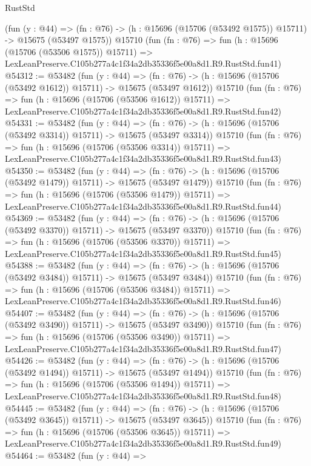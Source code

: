 \begin{lexlean}{RustStd}
\begin{coremodule}
    (fun (y : @44) =>
    (fn : @76) -> (h : @15696 (@15706 (@53492 @1575)) @15711) -> @15675 (@53497 @1575))
    @15710
    (fun (fn : @76) =>
    fun (h : @15696 (@15706 (@53506 @1575)) @15711) =>
    LexLeanPreserve.C105b277a4c1f34a2db35336f5e00a8d1.R9.RustStd.fun41)
@54312 := @53482
    (fun (y : @44) =>
    (fn : @76) -> (h : @15696 (@15706 (@53492 @1612)) @15711) -> @15675 (@53497 @1612))
    @15710
    (fun (fn : @76) =>
    fun (h : @15696 (@15706 (@53506 @1612)) @15711) =>
    LexLeanPreserve.C105b277a4c1f34a2db35336f5e00a8d1.R9.RustStd.fun42)
@54331 := @53482
    (fun (y : @44) =>
    (fn : @76) -> (h : @15696 (@15706 (@53492 @3314)) @15711) -> @15675 (@53497 @3314))
    @15710
    (fun (fn : @76) =>
    fun (h : @15696 (@15706 (@53506 @3314)) @15711) =>
    LexLeanPreserve.C105b277a4c1f34a2db35336f5e00a8d1.R9.RustStd.fun43)
@54350 := @53482
    (fun (y : @44) =>
    (fn : @76) -> (h : @15696 (@15706 (@53492 @1479)) @15711) -> @15675 (@53497 @1479))
    @15710
    (fun (fn : @76) =>
    fun (h : @15696 (@15706 (@53506 @1479)) @15711) =>
    LexLeanPreserve.C105b277a4c1f34a2db35336f5e00a8d1.R9.RustStd.fun44)
@54369 := @53482
    (fun (y : @44) =>
    (fn : @76) -> (h : @15696 (@15706 (@53492 @3370)) @15711) -> @15675 (@53497 @3370))
    @15710
    (fun (fn : @76) =>
    fun (h : @15696 (@15706 (@53506 @3370)) @15711) =>
    LexLeanPreserve.C105b277a4c1f34a2db35336f5e00a8d1.R9.RustStd.fun45)
@54388 := @53482
    (fun (y : @44) =>
    (fn : @76) -> (h : @15696 (@15706 (@53492 @3484)) @15711) -> @15675 (@53497 @3484))
    @15710
    (fun (fn : @76) =>
    fun (h : @15696 (@15706 (@53506 @3484)) @15711) =>
    LexLeanPreserve.C105b277a4c1f34a2db35336f5e00a8d1.R9.RustStd.fun46)
@54407 := @53482
    (fun (y : @44) =>
    (fn : @76) -> (h : @15696 (@15706 (@53492 @3490)) @15711) -> @15675 (@53497 @3490))
    @15710
    (fun (fn : @76) =>
    fun (h : @15696 (@15706 (@53506 @3490)) @15711) =>
    LexLeanPreserve.C105b277a4c1f34a2db35336f5e00a8d1.R9.RustStd.fun47)
@54426 := @53482
    (fun (y : @44) =>
    (fn : @76) -> (h : @15696 (@15706 (@53492 @1494)) @15711) -> @15675 (@53497 @1494))
    @15710
    (fun (fn : @76) =>
    fun (h : @15696 (@15706 (@53506 @1494)) @15711) =>
    LexLeanPreserve.C105b277a4c1f34a2db35336f5e00a8d1.R9.RustStd.fun48)
@54445 := @53482
    (fun (y : @44) =>
    (fn : @76) -> (h : @15696 (@15706 (@53492 @3645)) @15711) -> @15675 (@53497 @3645))
    @15710
    (fun (fn : @76) =>
    fun (h : @15696 (@15706 (@53506 @3645)) @15711) =>
    LexLeanPreserve.C105b277a4c1f34a2db35336f5e00a8d1.R9.RustStd.fun49)
@54464 := @53482
    (fun (y : @44) =>

\end{coremodule}
\end{lexlean}

